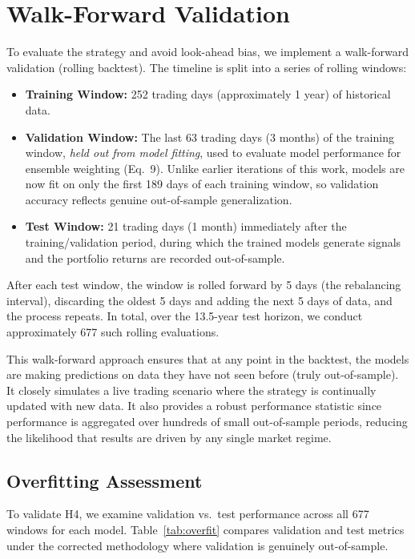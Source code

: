 \documentclass[conference]{IEEEtran}
\begin{document}
\section{Walk-Forward Validation}\label{sec:walkforward}
To evaluate the strategy and avoid look-ahead bias, we implement a walk-forward validation (rolling backtest). The timeline is split into a series of rolling windows:
\begin{itemize}
    \item \textbf{Training Window:} 252 trading days (approximately 1 year) of historical data.
    \item \textbf{Validation Window:} The last 63 trading days (3 months) of the training window, \emph{held out from model fitting}, used to evaluate model performance for ensemble weighting (Eq.~9). Unlike earlier iterations of this work, models are now fit on only the first 189 days of each training window, so validation accuracy reflects genuine out-of-sample generalization.
    \item \textbf{Test Window:} 21 trading days (1 month) immediately after the training/validation period, during which the trained models generate signals and the portfolio returns are recorded out-of-sample.
\end{itemize}
After each test window, the window is rolled forward by 5 days (the rebalancing interval), discarding the oldest 5 days and adding the next 5 days of data, and the process repeats. In total, over the 13.5-year test horizon, we conduct approximately 677 such rolling evaluations.

This walk-forward approach ensures that at any point in the backtest, the models are making predictions on data they have not seen before (truly out-of-sample). It closely simulates a live trading scenario where the strategy is continually updated with new data. It also provides a robust performance statistic since performance is aggregated over hundreds of small out-of-sample periods, reducing the likelihood that results are driven by any single market regime.

\subsection{Overfitting Assessment}
To validate H4, we examine validation vs.\ test performance across all 677 windows for each model. Table~\ref{tab:overfit} compares validation and test metrics under the corrected methodology where validation is genuinely out-of-sample.
\end{document}
